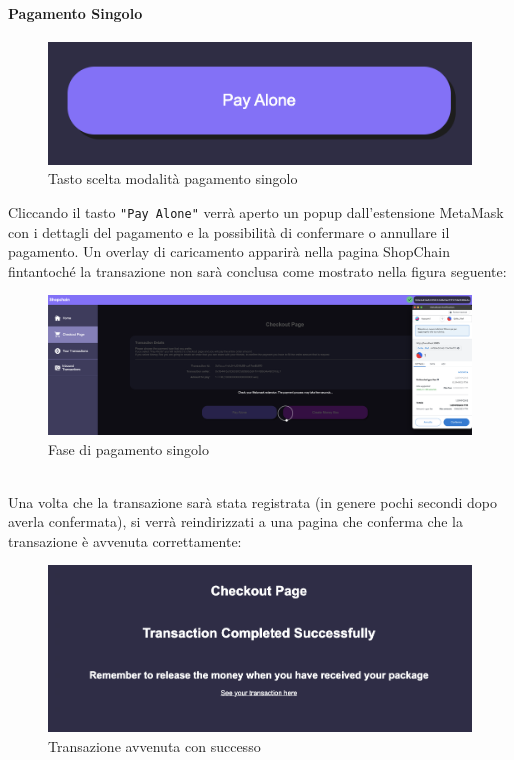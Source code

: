             \paragraph{Pagamento Singolo}
            \begin{figure}[H]
                \centering
                \includegraphics[scale=0.3]{immagini/Checkout/PayAlone.png}
                \caption{Tasto scelta modalità pagamento singolo}
            \end{figure}
            Cliccando il tasto \texttt{"Pay Alone"} verrà aperto un popup dall'estensione MetaMask con i dettagli del pagamento e la possibilità di confermare o annullare il pagamento. Un overlay di caricamento apparirà nella pagina ShopChain fintantoché la transazione non sarà conclusa come mostrato nella figura seguente:
            \begin{figure}[H]
                \centering
                \includegraphics[scale=0.2]{immagini/Checkout/SinglePaymentLayer.png}
                \caption{Fase di pagamento singolo}
            \end{figure}
            \textbf{}\\
            Una volta che la transazione sarà stata registrata (in genere pochi secondi dopo averla confermata), si verrà reindirizzati a una pagina che conferma che la transazione è avvenuta correttamente:
            \begin{figure}[H]
                \centering
                \includegraphics[scale=0.3]{immagini/Checkout/PayAloneTransactionSuccess.png}
                \caption{Transazione avvenuta con successo}
            \end{figure}
